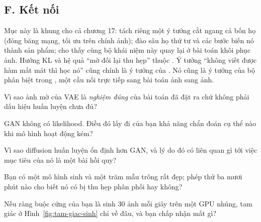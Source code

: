 \documentclass[../../../deep_learning.tex]{subfiles}
\begin{document}
\subsection{F. Kết nối}
Mục này là khung cho cả chương 17:  tách riêng một ý tưởng cắt ngang cả bốn họ (đóng băng mạng, tối ưu trên chính ảnh);  đào sâu họ thứ tư và các bước biến nó thành sản phẩm;  cho thấy cùng bộ khái niệm này quay lại ở bài toán khôi phục ảnh. Hướng KL và hệ quả ``mờ đối lại thu hẹp'' thuộc . Ý tưởng ``không viết được hàm mất mát thì học nó'' cũng chính là ý tưởng của  \cite{johnson2016perceptual}. Nó cũng là ý tưởng của bộ phân biệt trong  \cite{isola2017pix2pix}, một cầu nối trực tiếp sang bài toán ảnh sang ảnh.

\begin{tukiem}
\item Vì sao ảnh mờ của VAE là \emph{nghiệm đúng} của bài toán đã đặt ra chứ không phải dấu hiệu huấn luyện chưa đủ?
\item GAN không có likelihood. Điều đó lấy đi của bạn khả năng chẩn đoán cụ thể nào khi mô hình hoạt động kém?
\item Vì sao diffusion huấn luyện ổn định hơn GAN, và lý do đó có liên quan gì tới việc mục tiêu của nó là một bài hồi quy?
\item Bạn có một mô hình sinh và một trăm mẫu trông rất đẹp; phép thử ba mươi phút nào cho biết nó có bị thu hẹp phân phối hay không?
\item Nếu ràng buộc cứng của bạn là sinh 30 ảnh mỗi giây trên một GPU nhúng, tam giác ở Hình~\ref{fig:tam-giac-sinh} chỉ về đâu, và bạn chấp nhận mất gì?
\end{tukiem}
\ifSubfilesClassLoaded{\printbibliography[title={Nguồn}]}{}
\end{document}
